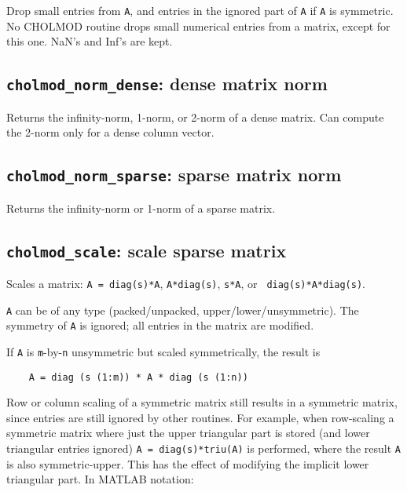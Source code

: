 \documentclass[11pt]{article}
\begin{document}

Drop small entries from {\tt A}, and entries in the ignored part of {\tt A} if
{\tt A} is symmetric.  No CHOLMOD routine drops small numerical entries from a
matrix, except for this one.  NaN's and Inf's are kept.

\subsection{{\tt cholmod\_norm\_dense}: dense matrix norm}


Returns the infinity-norm, 1-norm, or 2-norm of a dense matrix.
Can compute the 2-norm only for a dense column vector.

\subsection{{\tt cholmod\_norm\_sparse}: sparse matrix norm}


Returns the infinity-norm or 1-norm of a sparse matrix.

\subsection{{\tt cholmod\_scale}: scale sparse matrix}


Scales a matrix:  {\tt A = diag(s)*A}, {\tt A*diag(s)}, {\tt s*A}, or {\tt
diag(s)*A*diag(s)}.

{\tt A} can be of any type (packed/unpacked, upper/lower/unsymmetric).
The symmetry of {\tt A} is ignored; all entries in the matrix are modified.

If {\tt A} is {\tt m}-by-{\tt n} unsymmetric but scaled symmetrically, the
result is

\begin{verbatim}
    A = diag (s (1:m)) * A * diag (s (1:n))
\end{verbatim}

Row or column scaling of a symmetric matrix still results in a symmetric
matrix, since entries are still ignored by other routines.  For example, when
row-scaling a symmetric matrix where just the upper triangular part is stored
(and lower triangular entries ignored) {\tt A = diag(s)*triu(A)} is performed,
where the result {\tt A} is also symmetric-upper.  This has the effect of
modifying the implicit lower triangular part.  In MATLAB notation:
\end{document}
